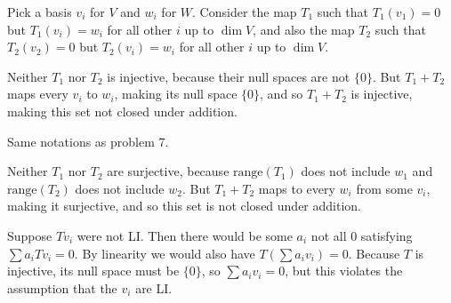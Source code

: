 \documentclass{article}
\begin{document}

Pick a basis $v_i$ for $V$ and $w_i$ for $W$. Consider the map $T_1$ such that
$T_1(v_1) = 0$ but $T_1(v_i) = w_i$ for all other $i$ up to $\dim V$, and also
the map $T_2$ such that $T_2(v_2) = 0$ but $T_2(v_i) = w_i$ for all other $i$ up
to $\dim V$.

Neither $T_1$ nor $T_2$ is injective, because their null spaces are not $\{0\}$.
But $T_1 + T_2$ maps every $v_i$ to $w_i$, making its null space $\{0\}$, and so
$T_1 + T_2$ is injective, making this set not closed under addition.


Same notations as problem 7.

Neither $T_1$ nor $T_2$ are surjective, because $\text{range}(T_1)$ does not
include $w_1$ and $\text{range}(T_2)$ does not include $w_2$. But $T_1 + T_2$
maps to every $w_i$ from some $v_i$, making it surjective, and so this set is
not closed under addition.


Suppose $Tv_i$ were not LI. Then there would be some $a_i$ not all 0 satisfying
$\sum a_iTv_i = 0$. By linearity we would also have $T(\sum a_iv_i) = 0$.
Because $T$ is injective, its null space must be $\{0\}$, so $\sum a_iv_i = 0$,
but this violates the assumption that the $v_i$ are LI.
\end{document}
